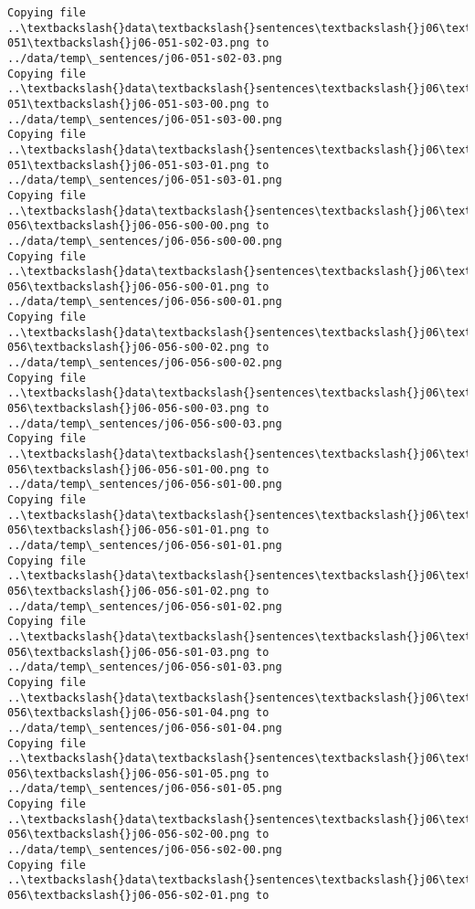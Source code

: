 \documentclass[11pt]{article}
\begin{document}
\begin{Verbatim}[commandchars=\\\{\}]
Copying file ..\textbackslash{}data\textbackslash{}sentences\textbackslash{}j06\textbackslash{}j06-051\textbackslash{}j06-051-s02-03.png to
../data/temp\_sentences/j06-051-s02-03.png
Copying file ..\textbackslash{}data\textbackslash{}sentences\textbackslash{}j06\textbackslash{}j06-051\textbackslash{}j06-051-s03-00.png to
../data/temp\_sentences/j06-051-s03-00.png
Copying file ..\textbackslash{}data\textbackslash{}sentences\textbackslash{}j06\textbackslash{}j06-051\textbackslash{}j06-051-s03-01.png to
../data/temp\_sentences/j06-051-s03-01.png
Copying file ..\textbackslash{}data\textbackslash{}sentences\textbackslash{}j06\textbackslash{}j06-056\textbackslash{}j06-056-s00-00.png to
../data/temp\_sentences/j06-056-s00-00.png
Copying file ..\textbackslash{}data\textbackslash{}sentences\textbackslash{}j06\textbackslash{}j06-056\textbackslash{}j06-056-s00-01.png to
../data/temp\_sentences/j06-056-s00-01.png
Copying file ..\textbackslash{}data\textbackslash{}sentences\textbackslash{}j06\textbackslash{}j06-056\textbackslash{}j06-056-s00-02.png to
../data/temp\_sentences/j06-056-s00-02.png
Copying file ..\textbackslash{}data\textbackslash{}sentences\textbackslash{}j06\textbackslash{}j06-056\textbackslash{}j06-056-s00-03.png to
../data/temp\_sentences/j06-056-s00-03.png
Copying file ..\textbackslash{}data\textbackslash{}sentences\textbackslash{}j06\textbackslash{}j06-056\textbackslash{}j06-056-s01-00.png to
../data/temp\_sentences/j06-056-s01-00.png
Copying file ..\textbackslash{}data\textbackslash{}sentences\textbackslash{}j06\textbackslash{}j06-056\textbackslash{}j06-056-s01-01.png to
../data/temp\_sentences/j06-056-s01-01.png
Copying file ..\textbackslash{}data\textbackslash{}sentences\textbackslash{}j06\textbackslash{}j06-056\textbackslash{}j06-056-s01-02.png to
../data/temp\_sentences/j06-056-s01-02.png
Copying file ..\textbackslash{}data\textbackslash{}sentences\textbackslash{}j06\textbackslash{}j06-056\textbackslash{}j06-056-s01-03.png to
../data/temp\_sentences/j06-056-s01-03.png
Copying file ..\textbackslash{}data\textbackslash{}sentences\textbackslash{}j06\textbackslash{}j06-056\textbackslash{}j06-056-s01-04.png to
../data/temp\_sentences/j06-056-s01-04.png
Copying file ..\textbackslash{}data\textbackslash{}sentences\textbackslash{}j06\textbackslash{}j06-056\textbackslash{}j06-056-s01-05.png to
../data/temp\_sentences/j06-056-s01-05.png
Copying file ..\textbackslash{}data\textbackslash{}sentences\textbackslash{}j06\textbackslash{}j06-056\textbackslash{}j06-056-s02-00.png to
../data/temp\_sentences/j06-056-s02-00.png
Copying file ..\textbackslash{}data\textbackslash{}sentences\textbackslash{}j06\textbackslash{}j06-056\textbackslash{}j06-056-s02-01.png to

\end{Verbatim}
\end{document}
